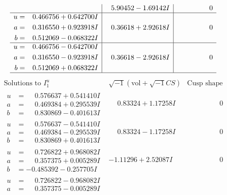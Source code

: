 \documentclass[1p]{elsarticle_modified}
\theoremstyle{definition}
\newcommand{\I}{\sqrt{-1}}
\begin{document}
$$\begin{array}{c|c|c}
 & \phantom{-}5.90452 - 1.69142 I & \phantom{-0.000000 } 0 \\ \hline\begin{aligned}
u &= \phantom{-}0.466756 + 0.642700 I \\
a &= \phantom{-}0.316550 + 0.923918 I \\
b &= \phantom{-}0.512069 - 0.068322 I\end{aligned}
 & \phantom{-}0.36618 + 2.92618 I & \phantom{-0.000000 } 0 \\ \hline\begin{aligned}
u &= \phantom{-}0.466756 - 0.642700 I \\
a &= \phantom{-}0.316550 - 0.923918 I \\
b &= \phantom{-}0.512069 + 0.068322 I\end{aligned}
 & \phantom{-}0.36618 - 2.92618 I & \phantom{-0.000000 } 0\\
 \hline 
 \end{array}$$\newpage$$\begin{array}{c|c|c}  
\text{Solutions to }I^u_{1}& \I (\text{vol} + \sqrt{-1}CS) & \text{Cusp shape}\\
 \hline 
\begin{aligned}
u &= \phantom{-}0.576637 + 0.541410 I \\
a &= \phantom{-}0.469384 + 0.295539 I \\
b &= \phantom{-}0.830869 - 0.401613 I\end{aligned}
 & \phantom{-}0.83324 + 1.17258 I & \phantom{-0.000000 } 0 \\ \hline\begin{aligned}
u &= \phantom{-}0.576637 - 0.541410 I \\
a &= \phantom{-}0.469384 - 0.295539 I \\
b &= \phantom{-}0.830869 + 0.401613 I\end{aligned}
 & \phantom{-}0.83324 - 1.17258 I & \phantom{-0.000000 } 0 \\ \hline\begin{aligned}
u &= \phantom{-}0.726822 + 0.968082 I \\
a &= \phantom{-}0.357375 + 0.005289 I \\
b &= -0.485392 - 0.257705 I\end{aligned}
 & -1.11296 + 2.52087 I & \phantom{-0.000000 } 0 \\ \hline\begin{aligned}
u &= \phantom{-}0.726822 - 0.968082 I \\
a &= \phantom{-}0.357375 - 0.005289 I \\

\end{aligned}
\end{array}$$
\end{document}

